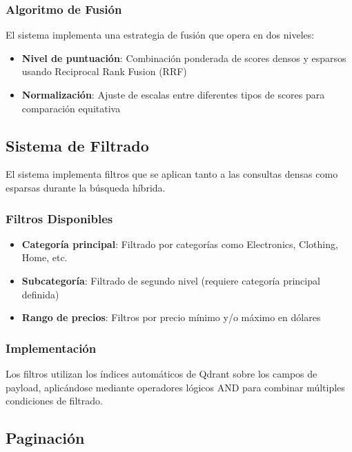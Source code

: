 \subsubsection{Algoritmo de Fusión}

El sistema implementa una estrategia de fusión que opera en dos niveles:

\begin{itemize}
    \item \textbf{Nivel de puntuación}: Combinación ponderada de scores densos y esparsos usando Reciprocal Rank Fusion (RRF)
    \item \textbf{Normalización}: Ajuste de escalas entre diferentes tipos de scores para comparación equitativa
\end{itemize}

\subsection{Sistema de Filtrado}

El sistema implementa filtros que se aplican tanto a las consultas densas como esparsas durante la búsqueda híbrida.

\subsubsection{Filtros Disponibles}

\begin{itemize}
    \item \textbf{Categoría principal}: Filtrado por categorías como Electronics, Clothing, Home, etc.
    \item \textbf{Subcategoría}: Filtrado de segundo nivel (requiere categoría principal definida)
    \item \textbf{Rango de precios}: Filtros por precio mínimo y/o máximo en dólares
\end{itemize}

\subsubsection{Implementación}

Los filtros utilizan los índices automáticos de Qdrant sobre los campos de payload, aplicándose mediante operadores lógicos AND para combinar múltiples condiciones de filtrado.

\subsection{Paginación}

